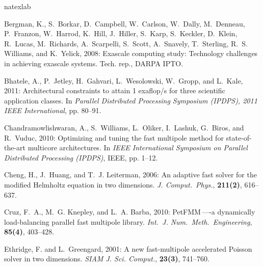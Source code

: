 \documentclass[10pt,twocolumn]{article}
\begin{document}
\small


\begin{thebibliography}{20}
\expandafter\ifx\csname natexlab\endcsname\relax\def\natexlab#1{#1}\fi

Bergman, K., S.~Borkar, D.~Campbell, W.~Carlson, W.~Dally, M.~Denneau,
  P.~Franzon, W.~Harrod, K.~Hill, J.~Hiller, S.~Karp, S.~Keckler, D.~Klein,
  R.~Lucas, M.~Richards, A.~Scarpelli, S.~Scott, A.~Snavely, T.~Sterling, R.~S.
  Williams, and K.~Yelick, 2008: Exascale computing study: Technology
  challenges in achieving exascale systems. Tech. rep., DARPA IPTO.

Bhatele, A., P.~Jetley, H.~Gahvari, L.~Wesolowski, W.~Gropp, and L.~Kale, 2011:
  Architectural constraints to attain 1 exaflop/s for three scientific
  application classes. In {\em Parallel Distributed Processing Symposium
  (IPDPS), 2011 IEEE International\/}, pp. 80--91.

Chandramowlishwaran, A., S.~Williams, L.~Oliker, I.~Lashuk, G.~Biros, and
  R.~Vuduc, 2010: Optimizing and tuning the fast multipole method for
  state-of-the-art multicore architectures. In {\em IEEE International
  Symposium on Parallel Distributed Processing (IPDPS)\/}, IEEE, pp. 1--12.

Cheng, H., J.~Huang, and T.~J. Leiterman, 2006: An adaptive fast solver for the
  modified {Helmholtz} equation in two dimensions. {\em J. Comput.\ Phys.\/},
  {\bf 211(2)}, 616--637.

Cruz, F.~A., M.~G. Knepley, and L.~A. Barba, 2010: {PetFMM}\,----a dynamically
  load-balancing parallel fast multipole library. {\em Int.\ J. Num.\ Meth.\
  Engineering\/}, {\bf 85(4)}, 403--428.

Ethridge, F. and L.~Greengard, 2001: A new fast-multipole accelerated {Poisson}
  solver in two dimensions. {\em SIAM J. Sci. Comput.\/}, {\bf 23(3)},
  741--760.


\end{thebibliography}
\end{document}
